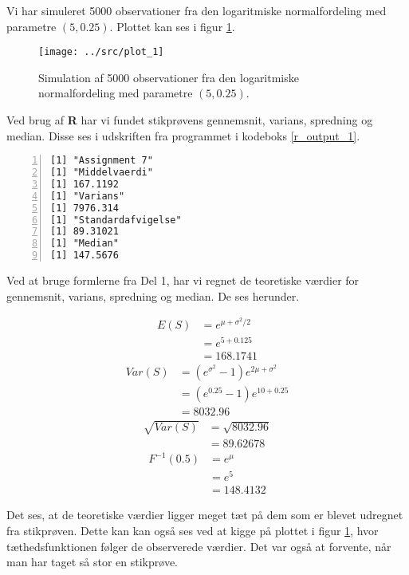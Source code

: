Vi har simuleret 5000 observationer fra den logaritmiske
normalfordeling med parametre $(5, 0.25)$. Plottet kan ses i figur \ref{log_plot_1}.
\begin{figure}[!h]
    \centering
    \texttt{[image: ../src/plot\_1]}
    \caption{Simulation af 5000 observationer fra den logaritmiske
    normalfordeling med parametre $(5, 0.25)$.}
    \label{log_plot_1}
\end{figure}

Ved brug af \textbf{R} har vi fundet stikprøvens gennemsnit, varians, spredning
og median. Disse ses i udskriften fra programmet i kodeboks \ref{r_output_1}.

\begin{lstlisting}[caption={Udskrift fra R-program},captionpos=b,label={r_output_1},numbers=left,
    frame=tb, breaklines=false, float=h]
[1] "Assignment 7"
[1] "Middelvaerdi"
[1] 167.1192
[1] "Varians"
[1] 7976.314
[1] "Standardafvigelse"
[1] 89.31021
[1] "Median"
[1] 147.5676
\end{lstlisting}

Ved at bruge formlerne fra Del 1, har vi regnet de teoretiske værdier for
gennemsnit, varians, spredning og median. De ses herunder.

\begin{align}
    E(S) & = e^{\mu+\sigma^{2}/2}\nonumber\\
         & = e^{5+0.125}\nonumber\\
         & = 168.1741
\end{align}
\begin{align}
    Var(S) & = (e^{\sigma^{2}} - 1)e^{2\mu+\sigma^2}\nonumber\\
    & = (e^{0.25} - 1)e^{10+0.25}\nonumber\\
    & = 8032.96
\end{align}
\begin{align}
    \sqrt{Var(S)} & = \sqrt{8032.96}\nonumber\\
    & = 89.62678
\end{align}
\begin{align}
    F^{-1}(0.5) & = e^{\mu}\nonumber\\
    & = e^{5}\nonumber\\
    & = 148.4132
\end{align}

Det ses, at de teoretiske værdier ligger meget tæt på dem som er blevet
udregnet fra stikprøven. Dette kan kan også ses ved at kigge på plottet i figur
\ref{log_plot_1}, hvor tæthedsfunktionen følger de observerede værdier.  Det
var også at forvente, når man har taget så stor en stikprøve.
